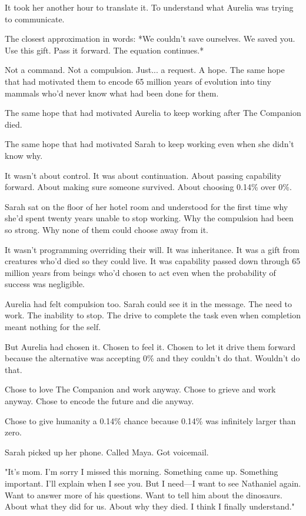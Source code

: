 It took her another hour to translate it. To understand what Aurelia was trying to communicate.

The closest approximation in words: *We couldn't save ourselves. We saved you. Use this gift. Pass it forward. The equation continues.*

Not a command. Not a compulsion. Just... a request. A hope. The same hope that had motivated them to encode 65 million years of evolution into tiny mammals who'd never know what had been done for them.

The same hope that had motivated Aurelia to keep working after The Companion died.

The same hope that had motivated Sarah to keep working even when she didn't know why.

It wasn't about control. It was about continuation. About passing capability forward. About making sure someone survived. About choosing 0.14\% over 0\%.

Sarah sat on the floor of her hotel room and understood for the first time why she'd spent twenty years unable to stop working. Why the compulsion had been so strong. Why none of them could choose away from it.

It wasn't programming overriding their will. It was inheritance. It was a gift from creatures who'd died so they could live. It was capability passed down through 65 million years from beings who'd chosen to act even when the probability of success was negligible.

Aurelia had felt compulsion too. Sarah could see it in the message. The need to work. The inability to stop. The drive to complete the task even when completion meant nothing for the self.

But Aurelia had chosen it. Chosen to feel it. Chosen to let it drive them forward because the alternative was accepting 0\% and they couldn't do that. Wouldn't do that.

Chose to love The Companion and work anyway. Chose to grieve and work anyway. Chose to encode the future and die anyway.

Chose to give humanity a 0.14\% chance because 0.14\% was infinitely larger than zero.

Sarah picked up her phone. Called Maya. Got voicemail.

"It's mom. I'm sorry I missed this morning. Something came up. Something important. I'll explain when I see you. But I need—I want to see Nathaniel again. Want to answer more of his questions. Want to tell him about the dinosaurs. About what they did for us. About why they died. I think I finally understand."

